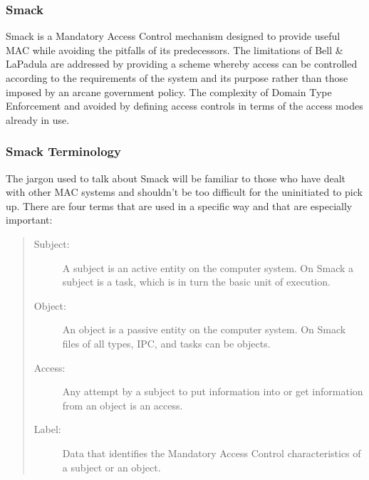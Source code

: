 \documentclass[a4paper,8pt,english]{sphinxmanual}
\begin{document}
\subsubsection{Smack}
\label{admin-guide/LSM/Smack:id1}
Smack is a Mandatory Access Control mechanism designed to provide useful MAC
while avoiding the pitfalls of its predecessors. The limitations of Bell \&
LaPadula are addressed by providing a scheme whereby access can be controlled
according to the requirements of the system and its purpose rather than those
imposed by an arcane government policy. The complexity of Domain Type
Enforcement and avoided by defining access controls in terms of the access
modes already in use.


\subsubsection{Smack Terminology}
\label{admin-guide/LSM/Smack:smack-terminology}
The jargon used to talk about Smack will be familiar to those who have dealt
with other MAC systems and shouldn't be too difficult for the uninitiated to
pick up. There are four terms that are used in a specific way and that are
especially important:
\begin{quote}
\begin{description}
\item[{Subject:}] \leavevmode
A subject is an active entity on the computer system.
On Smack a subject is a task, which is in turn the basic unit
of execution.

\item[{Object:}] \leavevmode
An object is a passive entity on the computer system.
On Smack files of all types, IPC, and tasks can be objects.

\item[{Access:}] \leavevmode
Any attempt by a subject to put information into or get
information from an object is an access.

\item[{Label:}] \leavevmode
Data that identifies the Mandatory Access Control
characteristics of a subject or an object.

\end{description}
\end{quote}
\end{document}
